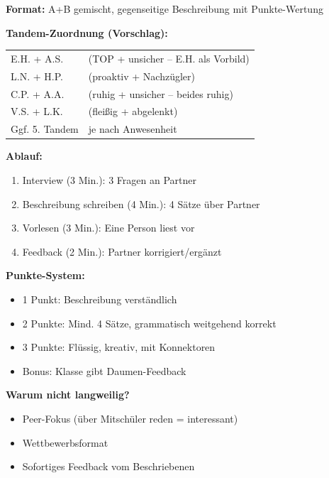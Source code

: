 \documentclass[11pt,a4paper]{article}
\begin{document}
\begin{gamebox}
\textbf{Format:} A+B gemischt, gegenseitige Beschreibung mit Punkte-Wertung

\textbf{Tandem-Zuordnung (Vorschlag):}
\begin{tabular}{ll}
\textcolor{gruppeA}{E.H.} + \textcolor{gruppeB}{A.S.} & (TOP + unsicher -- E.H. als Vorbild) \\
\textcolor{gruppeA}{L.N.} + \textcolor{gruppeB}{H.P.} & (proaktiv + Nachzügler) \\
\textcolor{gruppeA}{C.P.} + \textcolor{gruppeB}{A.A.} & (ruhig + unsicher -- beides ruhig) \\
\textcolor{gruppeA}{V.S.} + \textcolor{gruppeA}{L.K.} & (fleißig + abgelenkt) \\
Ggf. 5. Tandem & je nach Anwesenheit \\
\end{tabular}

\textbf{Ablauf:}
\begin{enumerate}
    \item Interview (3 Min.): 3 Fragen an Partner
    \item Beschreibung schreiben (4 Min.): 4 Sätze über Partner
    \item Vorlesen (3 Min.): Eine Person liest vor
    \item Feedback (2 Min.): Partner korrigiert/ergänzt
\end{enumerate}

\textbf{Punkte-System:}
\begin{itemize}
    \item 1 Punkt: Beschreibung verständlich
    \item 2 Punkte: Mind. 4 Sätze, grammatisch weitgehend korrekt
    \item 3 Punkte: Flüssig, kreativ, mit Konnektoren
    \item Bonus: Klasse gibt Daumen-Feedback
\end{itemize}

\textbf{Warum nicht langweilig?}
\begin{itemize}
    \item Peer-Fokus (über Mitschüler reden = interessant)
    \item Wettbewerbsformat
    \item Sofortiges Feedback vom Beschriebenen
\end{itemize}
\end{gamebox}

\newpage
\end{document}
